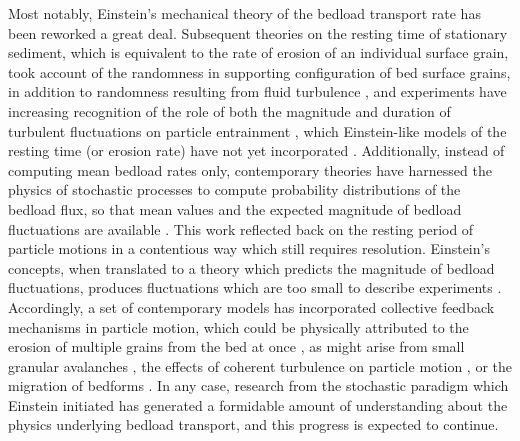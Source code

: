 \documentclass{article}
\begin{document}
Most notably, Einstein's mechanical theory of the bedload transport rate \citep{Einstein1950} has been reworked a great deal. 
Subsequent theories on the resting time of stationary sediment, which is equivalent to the rate of erosion of an individual surface grain, took account of the randomness in supporting configuration of bed surface grains, in addition to randomness resulting from fluid turbulence \citep{Paintal1971, Wu2002, Dey2018}, and experiments have increasing recognition of the role of both the magnitude and duration of turbulent fluctuations on particle entrainment \citep{Diplas2008, Valyrakis2010, Celik2014}, which Einstein-like models of the resting time (or erosion rate) have not yet incorporated \citep{Dey2018}. 
Additionally, instead of computing mean bedload rates only, contemporary theories have harnessed the physics of stochastic processes to compute probability distributions of the bedload flux, so that mean values and the expected magnitude of bedload fluctuations are available \citep{Lisle1998, Sun2000, Ancey2006, Ancey2008, Ma2014, Ancey2014}. 
This work reflected back on the resting period of particle motions in a contentious way which still requires resolution. 
Einstein's concepts, when translated to a theory which predicts the magnitude of bedload fluctuations, produces fluctuations which are too small to describe experiments \citep{Ancey2006}. 
Accordingly, a set of contemporary models has incorporated collective feedback mechanisms in particle motion, which could be physically attributed to the erosion of multiple grains from the bed at once \citep{Ancey2008, Heyman2013, Ma2014}, as might arise from small granular avalanches \citep{Heyman2013}, the effects of coherent turbulence on particle motion \citep{Nino1998, Amir2014, Santos2014, Shih2017}, or the migration of bedforms \citep{Dhont2018}. 
In any case, research from the stochastic paradigm which Einstein initiated has generated a formidable amount of understanding about the physics underlying bedload transport, and this progress is expected to continue. 
\end{document}

